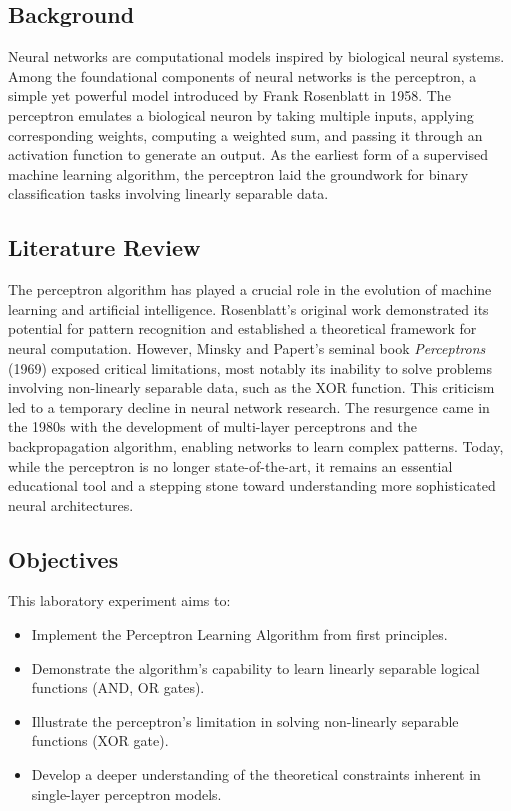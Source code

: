 \documentclass[a4paper, journal]{IEEEtran}
\begin{document}
\subsection{Background}
Neural networks are computational models inspired by biological neural systems. Among the foundational components of neural networks is the perceptron, a simple yet powerful model introduced by Frank Rosenblatt in 1958. \cite{rosenblatt1958perceptron} The perceptron emulates a biological neuron by taking multiple inputs, applying corresponding weights, computing a weighted sum, and passing it through an activation function to generate an output. As the earliest form of a supervised machine learning algorithm, the perceptron laid the groundwork for binary classification tasks involving linearly separable data.

\subsection{Literature Review}
The perceptron algorithm has played a crucial role in the evolution of machine learning and artificial intelligence. Rosenblatt's original work demonstrated its potential for pattern recognition and established a theoretical framework for neural computation. However, Minsky and Papert’s seminal book \textit{Perceptrons} (1969) exposed critical limitations, most notably its inability to solve problems involving non-linearly separable data, such as the XOR function. \cite{minsky1969perceptrons} This criticism led to a temporary decline in neural network research. The resurgence came in the 1980s with the development of multi-layer perceptrons and the backpropagation algorithm, enabling networks to learn complex patterns. Today, while the perceptron is no longer state-of-the-art, it remains an essential educational tool and a stepping stone toward understanding more sophisticated neural architectures.

\subsection{Objectives}
This laboratory experiment aims to:
\begin{itemize}
    \item Implement the Perceptron Learning Algorithm from first principles.
    \item Demonstrate the algorithm's capability to learn linearly separable logical functions (AND, OR gates).
    \item Illustrate the perceptron's limitation in solving non-linearly separable functions (XOR gate).
    \item Develop a deeper understanding of the theoretical constraints inherent in single-layer perceptron models.
\end{itemize}
\end{document}
